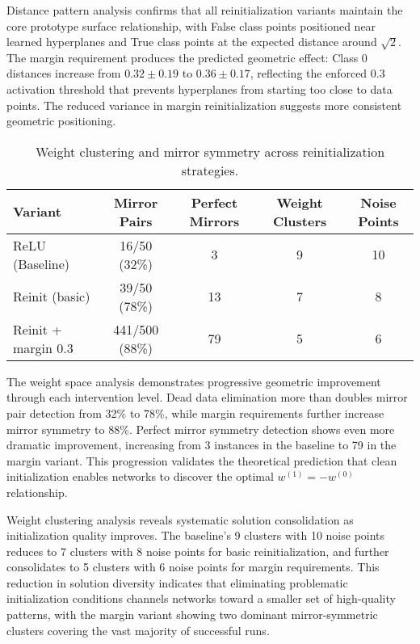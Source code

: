 Distance pattern analysis confirms that all reinitialization variants maintain the core prototype surface relationship, with False class points positioned near learned hyperplanes and True class points at the expected distance around $\sqrt{2}$. The margin requirement produces the predicted geometric effect: Class 0 distances increase from $0.32 \pm 0.19$ to $0.36 \pm 0.17$, reflecting the enforced 0.3 activation threshold that prevents hyperplanes from starting too close to data points. The reduced variance in margin reinitialization suggests more consistent geometric positioning.

\begin{table}[ht]
\centering
\caption{Weight clustering and mirror symmetry across reinitialization strategies.}
\label{tab:relu1-reinit-symmetry}
\begin{tabular}{lcccc}
\toprule
Variant & Mirror Pairs & Perfect Mirrors & Weight Clusters & Noise Points \\
\midrule
ReLU (Baseline) & 16/50 (32\%) & 3 & 9 & 10 \\
Reinit (basic) & 39/50 (78\%) & 13 & 7 & 8 \\
Reinit + margin 0.3 & 441/500 (88\%) & 79 & 5 & 6 \\
\bottomrule
\end{tabular}
\end{table}

The weight space analysis demonstrates progressive geometric improvement through each intervention level. Dead data elimination more than doubles mirror pair detection from 32\% to 78\%, while margin requirements further increase mirror symmetry to 88\%. Perfect mirror symmetry detection shows even more dramatic improvement, increasing from 3 instances in the baseline to 79 in the margin variant. This progression validates the theoretical prediction that clean initialization enables networks to discover the optimal $w^{(1)} = -w^{(0)}$ relationship.

Weight clustering analysis reveals systematic solution consolidation as initialization quality improves. The baseline's 9 clusters with 10 noise points reduces to 7 clusters with 8 noise points for basic reinitialization, and further consolidates to 5 clusters with 6 noise points for margin requirements. This reduction in solution diversity indicates that eliminating problematic initialization conditions channels networks toward a smaller set of high-quality patterns, with the margin variant showing two dominant mirror-symmetric clusters covering the vast majority of successful runs.

